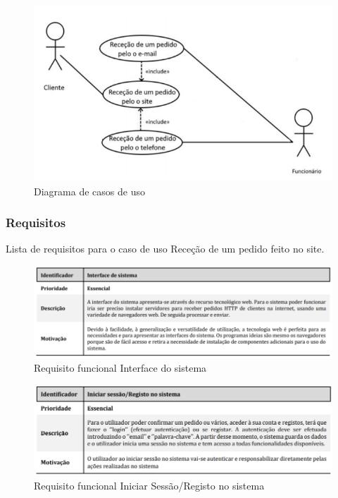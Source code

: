 \begin{figure}[H]
	\centering
	\includegraphics{diagrama_casos_de_uso}
	\caption{Diagrama de casos de uso}
	\label{fig:diagramacasosdeuso}
\end{figure}

\subsubsection{Requisitos}
Lista de requisitos para o caso de uso Receção de um pedido feito no site.\\
\begin{figure}[H]
	\centering
	\includegraphics[width=15cm]{requisito_funcional1}
	\caption{Requisito funcional Interface do sistema}
	\label{fig:requisitofuncional1}
\end{figure}

\begin{figure}[H]
	\centering
	\includegraphics[width=15cm]{requisito_funcional2}
	\caption{Requisito funcional Iniciar Sessão/Registo no sistema}
	\label{fig:requisitofuncional2}
\end{figure}

